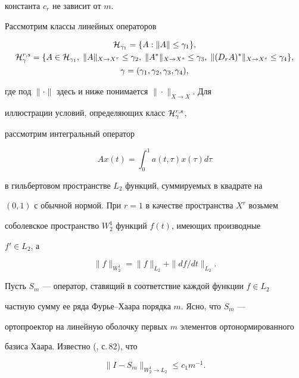 константа $c_r$ не зависит от $m$.





Рассмотрим классы линейных операторов


\begin{gather*}


{\cal H}_{\gamma_1} = \{A: \|A\| \le \gamma_1\}, \\


{\cal H}_{\gamma}^{r,s} = \{A\in {\cal H}_{\gamma_1},\;


\|A\|_{X\to X^r}\le\gamma_2,\; \|A^*\|_{X\to X^s}\le\gamma_3,\;


\|(D_rA)^*\|_{X\to X^s}\le\gamma_4\}, \\


\gamma=(\gamma_1,\gamma_2,\gamma_3,\gamma_4),


\end{gather*}


где под $\|\cdot\|$ здесь и ниже понимается $\|\cdot\|_{X\to X}$. Для


иллюстрации условий, определяющих класс ${\cal H}_{\gamma}^{r,s}$,


рассмотрим  интегральный оператор


$$


Ax(t) = \int_0^1 a(t,\tau)x(\tau)d\tau


$$


в гильбертовом пространстве $L_2$ функций, суммируемых в квадрате на


$(0,1)$ с обычной нормой. При $r=1$ в качестве пространства $X^r$ возьмем


соболевское пространство $W_2^1$ функций $f(t)$, имеющих производные


$f'\in L_2$, а


$$


\|f\|_{W_2^1} = \|f\|_{L_2} + \|df/dt\|_{L_2}.


$$


Пусть $S_m$ --- оператор, ставящий в соответствие каждой функции $f\in L_2$


частную сумму ее ряда Фурье--Хаара порядка $m$. Ясно, что $S_m$ ---


ортопроектор на линейную оболочку первых $m$ элементов ортонормированного


базиса Хаара. Известно (\cite{KS}, с.\,82), что


$$


\|I - S_m\|_{W_2^1\to L_2} \le c_1 m^{-1} .


$$


